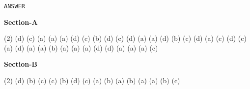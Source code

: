 \documentclass{article}
\begin{document}
\pagebreak

\begin{center}
\texttt{ANSWER}
\end{center}

\begin{center}
\textbf{Section-A}
\end{center}
\begin{tasks}[label=\arabic*.](2)
\task (d)
\task (c)
\task (a)
\task (a)
\task (a)
\task (d)
\task (c)
\task (b)
\task (d)
\task (c)
\task (d)
\task (a)
\task (a)
\task (d)
\task (b)
\task (c)
\task (d)
\task (a)
\task (c)
\task (d)
\task (c)
\task (a)
\task (d)
\task (a)
\task (a)
\task (b)
\task (a)
\task (a)
\task (a)
\task (d)
\task (d)
\task (a)
\task (a)
\task (a)
\task (c)
\end{tasks}

\begin{center}
\textbf{Section-B}
\end{center}
\begin{tasks}[label=\arabic*.](2)
\task (d)
\task (b)
\task (c)
\task (c)
\task (b)
\task (d)
\task (c)
\task (a)
\task (b)
\task (a)
\task (b)
\task (a)
\task (a)
\task (b)
\task (c)
\end{tasks}
\end{document}
